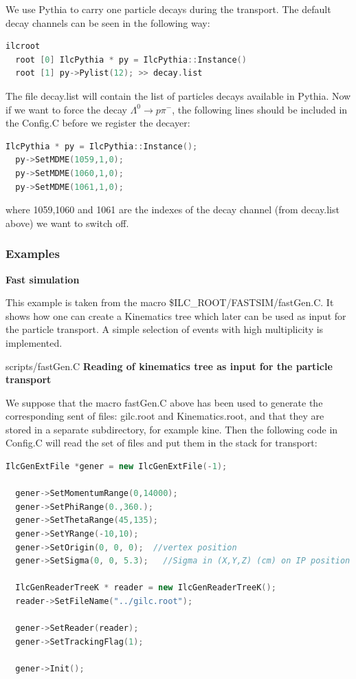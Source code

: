 \documentclass[12pt,a4paper,twoside]{article}
\begin{document}
We use Pythia to carry one particle decays during the transport. The
default decay channels can be seen in the following way:

\begin{lstlisting}[language=C++]
  ilcroot
  root [0] IlcPythia * py = IlcPythia::Instance()
  root [1] py->Pylist(12); >> decay.list
\end{lstlisting}

The file decay.list will contain the list of particles decays
available in Pythia. Now if we want to force the decay $\Lambda^0 \to
p \pi^-$, the following lines should be included in the Config.C
before we register the decayer:

\begin{lstlisting}[language=C++]
  IlcPythia * py = IlcPythia::Instance();
  py->SetMDME(1059,1,0);
  py->SetMDME(1060,1,0);
  py->SetMDME(1061,1,0);
\end{lstlisting}

where 1059,1060 and 1061 are the indexes of the decay channel (from
decay.list above) we want to switch off.

\subsubsection{Examples}

\noindent
\textbf{Fast simulation}

This example is taken from the macro
\$ILC\_ROOT/FASTSIM/fastGen.C. It shows how one can create a
Kinematics tree which later can be used as input for the particle
transport. A simple selection of events with high multiplicity is
implemented. 

 {scripts/fastGen.C}
\noindent
\textbf{Reading of kinematics tree as input for the particle transport}

We suppose that the macro fastGen.C above has been used to generate
the corresponding sent of files: gilc.root and Kinematics.root, and
that they are stored in a separate subdirectory, for example kine. Then
the following code in Config.C will read the set of files and put them
in the stack for transport:

\begin{lstlisting}[language=C++]
  IlcGenExtFile *gener = new IlcGenExtFile(-1);

  gener->SetMomentumRange(0,14000);
  gener->SetPhiRange(0.,360.);
  gener->SetThetaRange(45,135);
  gener->SetYRange(-10,10);
  gener->SetOrigin(0, 0, 0);  //vertex position
  gener->SetSigma(0, 0, 5.3);   //Sigma in (X,Y,Z) (cm) on IP position

  IlcGenReaderTreeK * reader = new IlcGenReaderTreeK();
  reader->SetFileName("../gilc.root");

  gener->SetReader(reader);
  gener->SetTrackingFlag(1);
  
  gener->Init();
\end{lstlisting}
\end{document}
